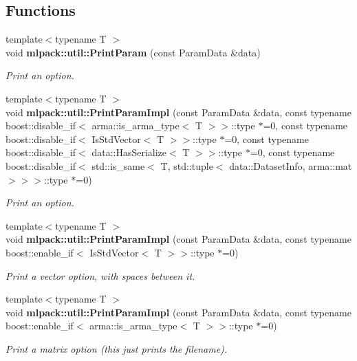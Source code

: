 \subsection*{Functions}
\begin{DoxyCompactItemize}
\item 
{\footnotesize template$<$typename T $>$ }\\void {\bf mlpack\+::util\+::\+Print\+Param} (const Param\+Data \&data)
\begin{DoxyCompactList}\small\item\em Print an option. \end{DoxyCompactList}\item 
{\footnotesize template$<$typename T $>$ }\\void {\bf mlpack\+::util\+::\+Print\+Param\+Impl} (const Param\+Data \&data, const typename boost\+::disable\+\_\+if$<$ arma\+::is\+\_\+arma\+\_\+type$<$ T $>$$>$\+::type $\ast$=0, const typename boost\+::disable\+\_\+if$<$ Is\+Std\+Vector$<$ T $>$$>$\+::type $\ast$=0, const typename boost\+::disable\+\_\+if$<$ data\+::\+Has\+Serialize$<$ T $>$$>$\+::type $\ast$=0, const typename boost\+::disable\+\_\+if$<$ std\+::is\+\_\+same$<$ T, std\+::tuple$<$ data\+::\+Dataset\+Info, arma\+::mat $>$$>$$>$\+::type $\ast$=0)
\begin{DoxyCompactList}\small\item\em Print an option. \end{DoxyCompactList}\item 
{\footnotesize template$<$typename T $>$ }\\void {\bf mlpack\+::util\+::\+Print\+Param\+Impl} (const Param\+Data \&data, const typename boost\+::enable\+\_\+if$<$ Is\+Std\+Vector$<$ T $>$$>$\+::type $\ast$=0)
\begin{DoxyCompactList}\small\item\em Print a vector option, with spaces between it. \end{DoxyCompactList}\item 
{\footnotesize template$<$typename T $>$ }\\void {\bf mlpack\+::util\+::\+Print\+Param\+Impl} (const Param\+Data \&data, const typename boost\+::enable\+\_\+if$<$ arma\+::is\+\_\+arma\+\_\+type$<$ T $>$$>$\+::type $\ast$=0)
\begin{DoxyCompactList}\small\item\em Print a matrix option (this just prints the filename). \end{DoxyCompactList}\item 
$$
\end{DoxyCompactItemize}
